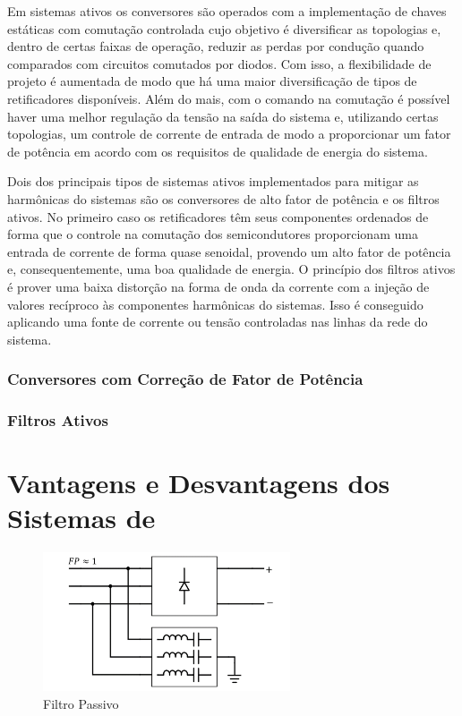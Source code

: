 Em sistemas ativos os conversores são operados com a implementação de chaves estáticas com comutação controlada cujo objetivo é diversificar as topologias e, dentro de certas faixas de operação, reduzir as perdas por condução quando comparados com circuitos comutados por diodos. Com isso, a flexibilidade de projeto é aumentada de modo que há uma maior diversificação de tipos de retificadores disponíveis. Além do mais, com o comando na comutação é possível haver uma melhor regulação da tensão na saída do sistema e, utilizando certas topologias, um controle de corrente de entrada de modo a proporcionar um fator de potência em acordo com os requisitos de qualidade de energia do sistema.

Dois dos principais tipos de sistemas ativos implementados para mitigar as harmônicas do sistemas são os conversores de alto fator de potência e os filtros ativos. No primeiro caso os retificadores têm seus componentes ordenados de forma que o controle na comutação dos semicondutores proporcionam uma entrada de corrente de forma quase senoidal, provendo um alto fator de potência e, consequentemente, uma boa qualidade de energia. O princípio dos filtros ativos é prover uma baixa distorção na forma de onda da corrente com a injeção de valores recíproco às componentes harmônicas do sistemas. Isso é conseguido aplicando uma fonte de corrente ou tensão controladas nas linhas da rede do sistema. 

\subsubsection{Conversores com Correção de Fator de Potência}

\subsubsection{Filtros Ativos}

\section{Vantagens e Desvantagens dos Sistemas de }

\begin{figure}[!htbp]
	\centering
	\includegraphics[width=0.65\textwidth]{Cap2/Figuras/sch_filtro_passivo.png}
	\caption{Filtro Passivo}
	\label{fig:sch_filtro_passivo}
\end{figure}

